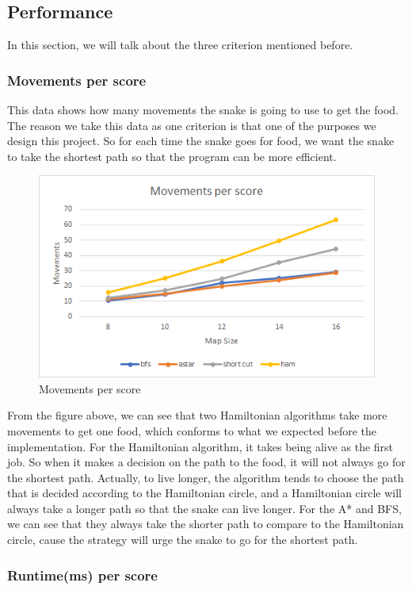 \documentclass[12pt]{article}
\begin{document}
\subsection{Performance}
In this section, we will talk about the three criterion mentioned before.
\subsubsection{Movements per score}
This data shows how many movements the snake is going to use to get the food. The reason 
we take this data as one criterion is that one of the purposes we design this project. So 
for each time the snake goes for food, we want the snake to take the shortest path so that 
the program can be more efficient. 

\begin{figure}[H]
    \centering 
    \includegraphics[scale = 0.9]{anay1.png}
    \caption{Movements per score}
\end{figure}

From the figure above, we can see that two Hamiltonian algorithms take more movements to get one 
food, which conforms to what we expected before the implementation. For the Hamiltonian algorithm, 
it takes being alive as the first job. So when it makes a decision on the path to the food, it 
will not always go for the shortest path. Actually, to live longer, the algorithm tends to 
choose the path that is decided according to the Hamiltonian circle, and a Hamiltonian circle will 
always take a longer path so that the snake can live longer. For the A* and BFS, we can see 
that they always take the shorter path to compare to the Hamiltonian circle, cause the strategy 
will urge the snake to go for the shortest path. 

\subsubsection{Runtime(ms) per score}
\end{document}
